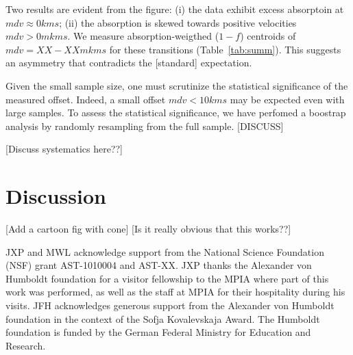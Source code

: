 \documentclass[iop]{emulateapj}
\begin{document}
Two results are evident from the figure:
 (i) the data exhibit excess absorptoin at 
 $mdv \approx 0 kms$;
 (ii) the absorption is skewed towards positive velocities
 $mdv > 0 mkms$.
We measure absorption-weigthed ($1-f$) centroids
of $mdv = XX-XX mkms$ for these transitions
(Table~\ref{tab:summ}).
This suggests an asymmetry that contradicts the [standard]
expectation.  

Given the small sample size, one must 
scrutinize the statistical significance of the measured offset.
Indeed, a small offset $mdv < 10 kms$ may be expected
even with large samples.  To assess the statistical significance,
we have perfomed a boostrap analysis by randomly resampling
from the full sample. [DISCUSS]

[Discuss systematics here??]

\section{Discussion}
\label{sec:discussion}

[Add a cartoon fig with cone]
[Is it really obvious that this works??]


\acknowledgements

JXP and MWL acknowledge support from the National
Science Foundation (NSF) grant AST-1010004 and AST-XX. 
JXP thanks the Alexander
von Humboldt foundation for a visitor fellowship to the MPIA where
part of this work was performed, as well as the staff at MPIA for
their hospitality during his visits.
JFH acknowledges generous support from the Alexander von Humboldt
foundation in the context of the Sofja Kovalevskaja Award. The
Humboldt foundation is funded by the German Federal Ministry for
Education and Research.  
\end{document}
